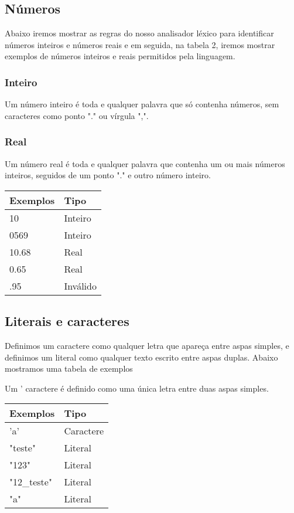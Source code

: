 \documentclass[
12pt,				%
a4paper,			%
english,			%
french,				%
spanish,			%
brazil,				%
article
]{abntex2}
\begin{document}
\subsection{Números}
Abaixo iremos mostrar as regras do nosso analisador léxico para identificar números inteiros e números reais e em seguida, na tabela 2, iremos mostrar exemplos de números inteiros e reais permitidos pela linguagem.
\subsubsection{Inteiro}
Um número inteiro é toda e qualquer palavra que só contenha números, sem caracteres como ponto "." ou vírgula ",".
\subsubsection{Real}
Um número real é toda e qualquer palavra que contenha um ou mais números inteiros, seguidos de um ponto "." e outro número inteiro.

\begin{center}
	\begin{tabular}{ll}
		\hline Exemplos & Tipo \\
		\hline 10 & Inteiro \\
		\hline 0569 & Inteiro \\
		\hline 10.68 & Real \\
		\hline 0.65 & Real \\
		\hline .95 & Inválido \\
		\hline
	\end{tabular}
	\label{tab:}
\end{center}

\subsection{Literais e caracteres}
Definimos um caractere como qualquer letra que apareça entre aspas simples, e definimos um literal como qualquer texto escrito entre aspas duplas. Abaixo mostramos uma tabela de exemplos

Um ' caractere é definido como uma única letra entre duas aspas simples.

\begin{center}
	\begin{tabular}{ll}
		\hline Exemplos & Tipo \\
		\hline 'a' & Caractere \\
		\hline "teste" & Literal \\
		\hline "123" & Literal \\
		\hline "12\_teste" & Literal \\
		\hline "a" & Literal \\
		\hline
	\end{tabular}
	\label{tab:}
\end{center}
\end{document}
